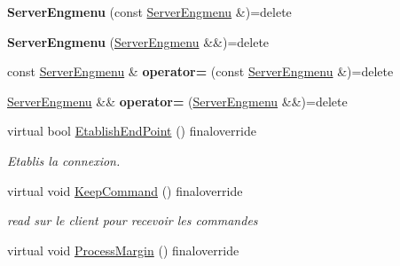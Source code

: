 \begin{DoxyCompactItemize}
\item 
{\bfseries Server\+Engmenu} (const \hyperlink{classServerEngmenu}{Server\+Engmenu} \&)=delete\hypertarget{classServerEngmenu_aeb98bc559b12c73a84d7321aa60a67e5}{}\label{classServerEngmenu_aeb98bc559b12c73a84d7321aa60a67e5}

\item 
{\bfseries Server\+Engmenu} (\hyperlink{classServerEngmenu}{Server\+Engmenu} \&\&)=delete\hypertarget{classServerEngmenu_a2eb05781e09498c058727bd443351621}{}\label{classServerEngmenu_a2eb05781e09498c058727bd443351621}

\item 
const \hyperlink{classServerEngmenu}{Server\+Engmenu} \& {\bfseries operator=} (const \hyperlink{classServerEngmenu}{Server\+Engmenu} \&)=delete\hypertarget{classServerEngmenu_a6143b7294251606818d67c3a347d2ac7}{}\label{classServerEngmenu_a6143b7294251606818d67c3a347d2ac7}

\item 
\hyperlink{classServerEngmenu}{Server\+Engmenu} \&\& {\bfseries operator=} (\hyperlink{classServerEngmenu}{Server\+Engmenu} \&\&)=delete\hypertarget{classServerEngmenu_a10ed3d71a29565d8887a1a321bb8d2a2}{}\label{classServerEngmenu_a10ed3d71a29565d8887a1a321bb8d2a2}

\item 
virtual bool \hyperlink{classServerEngmenu_a4fda37dbb8dae5e5aa5b7a59ebf518b8}{Etablish\+End\+Point} () finaloverride
\begin{DoxyCompactList}\small\item\em Etablis la connexion. \end{DoxyCompactList}\item 
virtual void \hyperlink{classServerEngmenu_a27d08dd4167e60cb90a0a097cd41a2bd}{Keep\+Command} () finaloverride\hypertarget{classServerEngmenu_a27d08dd4167e60cb90a0a097cd41a2bd}{}\label{classServerEngmenu_a27d08dd4167e60cb90a0a097cd41a2bd}

\begin{DoxyCompactList}\small\item\em read sur le client pour recevoir les commandes \end{DoxyCompactList}\item 
virtual void \hyperlink{classServerEngmenu_a50b30a6ca3a1ffcddf051289dc65c996}{Process\+Margin} () finaloverride\hypertarget{classServerEngmenu_a50b30a6ca3a1ffcddf051289dc65c996}{}\label{classServerEngmenu_a50b30a6ca3a1ffcddf051289dc65c996}


\end{DoxyCompactItemize}
